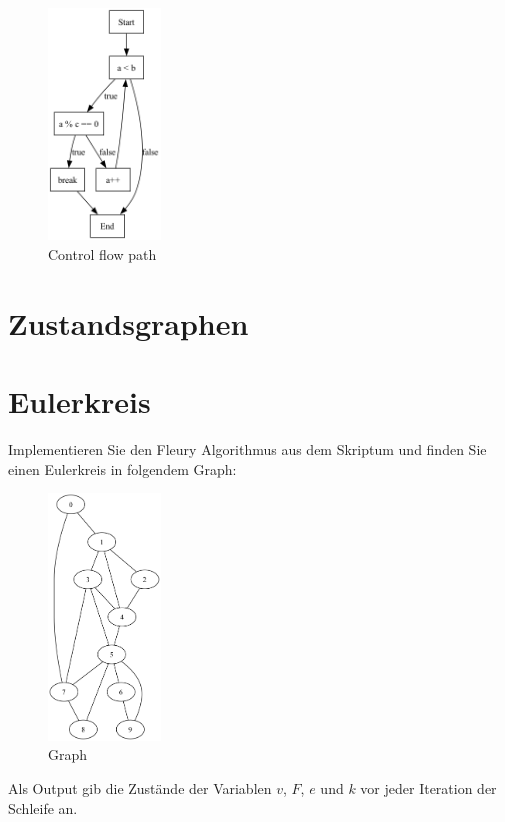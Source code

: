 \documentclass[a4paper,11pt]{report}
\begin{document}
\begin{figure}[htbp]
    \centering
    \includegraphics[width=3cm]{notebook/assets/aufgabe_05_graph.png}
    \caption{Control flow path}
    \label{fig:program_graph}
\end{figure}

\newpage

\chapter{Zustandsgraphen}



\newpage

\chapter{Eulerkreis}

Implementieren Sie den Fleury Algorithmus aus dem Skriptum und finden Sie einen Eulerkreis in folgendem Graph:
\begin{figure}[htbp]
    \centering
    \includegraphics[width=3cm]{notebook/assets/aufgabe_07_graph.png}
    \caption{Graph}
    \label{fig:eulerkreis_graph}
\end{figure}

Als Output gib die Zustände der Variablen $v$, $F$, $e$ und $k$ vor jeder Iteration der Schleife an.
\end{document}
